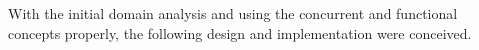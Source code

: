 
With the initial domain analysis and using the concurrent and functional concepts properly, the following design and implementation were conceived. 